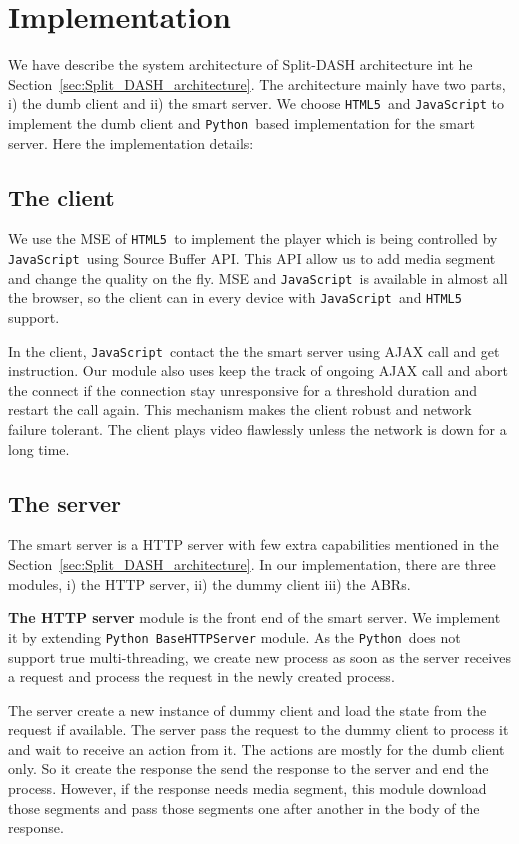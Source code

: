 \newcommand{\html}{{\tt HTML5 }}
\newcommand{\js}{{\tt JavaScript }}
\newcommand{\python}{{\tt Python }}


\section{Implementation}
We have describe the system architecture of Split-DASH architecture int he Section~\ref{sec:Split_DASH_architecture}. The architecture mainly have two parts, i) the dumb client and ii) the smart server. We choose \html and {\tt JavaScript} to implement the dumb client and \python based implementation for the smart server. Here the implementation details:

\subsection{The client}
We use the MSE of \html to implement the player which is being controlled by \js using Source Buffer API. This API allow us to add media segment and change the quality on the fly. MSE and \js is available in almost all the browser, so the client can in every device with \js and \html support.

In the client, \js contact the the smart server using AJAX call and get instruction. Our module also uses keep the track of ongoing AJAX call and abort the connect if the connection stay unresponsive for a threshold duration and restart the call again. This mechanism makes the client robust and network failure tolerant. The client plays video flawlessly unless the network is down for a long time.

\subsection{The server}
The smart server is a HTTP server with few extra capabilities mentioned in the Section~\ref{sec:Split_DASH_architecture}. In our implementation, there are three modules, i) the HTTP server, ii) the dummy client iii) the ABRs.

{\bf The HTTP server} module is the front end of the smart server. We implement it by extending \python {\tt BaseHTTPServer} module. As the \python does not support true multi-threading, we create new process as soon as the server receives a request and process the request in the newly created process.

The server create a new instance of dummy client and load the state from the request if available. The server pass the request to the dummy client to process it and wait to receive an action from it. The actions are mostly for the dumb client only. So it create the response the send the response to the server and end the process. However, if the response needs media segment, this module download those segments and pass those segments one after another in the body of the response.

